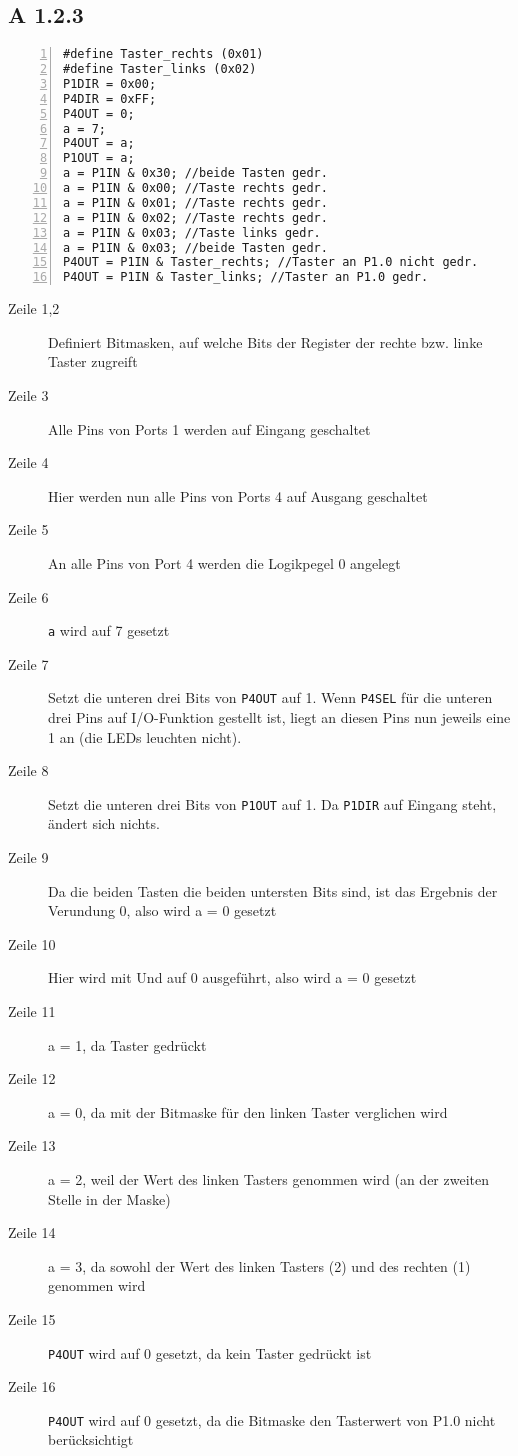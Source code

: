 \documentclass[11pt,a4paper,ngerman]{article}
\begin{document}
\subsection*{A 1.2.3} 
\begin{lstlisting}[numbers=left]
#define Taster_rechts (0x01)
#define Taster_links (0x02)
P1DIR = 0x00;
P4DIR = 0xFF;
P4OUT = 0;
a = 7;
P4OUT = a;
P1OUT = a;
a = P1IN & 0x30; //beide Tasten gedr.
a = P1IN & 0x00; //Taste rechts gedr.
a = P1IN & 0x01; //Taste rechts gedr.
a = P1IN & 0x02; //Taste rechts gedr.
a = P1IN & 0x03; //Taste links gedr.
a = P1IN & 0x03; //beide Tasten gedr.
P4OUT = P1IN & Taster_rechts; //Taster an P1.0 nicht gedr.
P4OUT = P1IN & Taster_links; //Taster an P1.0 gedr.
\end{lstlisting}
\begin{description}
\item[Zeile 1,2] Definiert Bitmasken, auf welche Bits der Register der rechte bzw. linke Taster zugreift
\item[Zeile 3] Alle Pins von Ports 1 werden auf Eingang geschaltet
\item[Zeile 4] Hier werden nun alle Pins von Ports 4 auf Ausgang geschaltet
\item[Zeile 5] An alle Pins von Port 4 werden die Logikpegel 0 angelegt
\item[Zeile 6] \texttt{a} wird auf 7 gesetzt
\item[Zeile 7] Setzt die unteren drei Bits von \texttt{P4OUT} auf 1. Wenn \texttt{P4SEL} für die unteren drei Pins auf I/O-Funktion gestellt ist, liegt an diesen Pins nun jeweils eine 1 an (die LEDs leuchten nicht).
\item[Zeile 8] Setzt die unteren drei Bits von \texttt{P1OUT} auf 1. Da \texttt{P1DIR} auf Eingang steht, ändert sich nichts.
\item[Zeile 9] Da die beiden Tasten die beiden untersten Bits sind, ist das Ergebnis der Verundung 0, also wird a = 0 gesetzt
\item[Zeile 10] Hier wird mit Und auf 0 ausgeführt, also wird a = 0 gesetzt
\item[Zeile 11] a = 1, da Taster gedrückt
\item[Zeile 12] a = 0, da mit der Bitmaske für den linken Taster verglichen wird
\item[Zeile 13] a = 2, weil der Wert des linken Tasters genommen wird (an der zweiten Stelle in der Maske)
\item[Zeile 14] a = 3, da sowohl der Wert des linken Tasters (2) und des rechten (1) genommen wird
\item[Zeile 15] \texttt{P4OUT} wird auf 0 gesetzt, da kein Taster gedrückt ist
\item[Zeile 16] \texttt{P4OUT} wird auf 0 gesetzt, da die Bitmaske den Tasterwert von P1.0 nicht berücksichtigt
\end{description}
\end{document}
